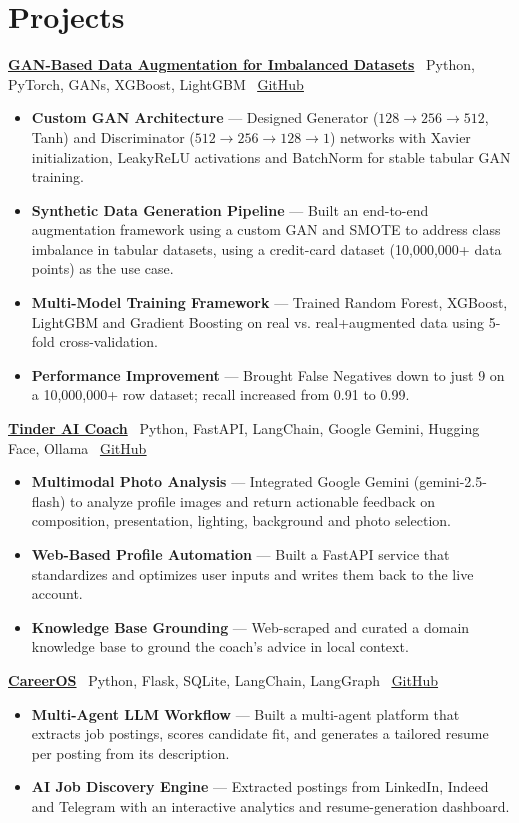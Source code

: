 \documentclass[a4paper,10pt]{article}
\newcommand{\resumeItem}[1]{\item\small{#1}}
\newcommand{\resumeProject}[3]{\vspace{6pt}\underline{\textbf{\normalsize #1}} \textbar\ \small #2 \textbar\ \href{#3}{\underline{GitHub}}\vspace{1pt}}
\newcommand{\resumeItemListStart}{\begin{itemize}[leftmargin=0.18in,itemsep=1pt,topsep=1pt]}
\newcommand{\resumeItemListEnd}{\end{itemize}\vspace{1pt}}
\begin{document}
\section{Projects}

\vspace{-4pt}

\resumeProject
{GAN-Based Data Augmentation for Imbalanced Datasets}
{Python, PyTorch, GANs, XGBoost, LightGBM}
{https://github.com/gorredinesh21/FINAL_YEAR_PROJECT/tree/main}
\resumeItemListStart
\resumeItem{
\textbf{Custom GAN Architecture} --- Designed Generator ($128 \rightarrow 256 \rightarrow 512$, Tanh) and Discriminator ($512 \rightarrow 256 \rightarrow 128 \rightarrow 1$) networks with Xavier initialization, LeakyReLU activations and BatchNorm for stable tabular GAN training.
}
\resumeItem{
\textbf{Synthetic Data Generation Pipeline} --- Built an end-to-end augmentation framework using a custom GAN and SMOTE to address class imbalance in tabular datasets, using a credit-card dataset (10,000,000+ data points) as the use case.
}
\resumeItem{
\textbf{Multi-Model Training Framework} --- Trained Random Forest, XGBoost, LightGBM and Gradient Boosting on real vs. real+augmented data using 5-fold cross-validation.
}
\resumeItem{
\textbf{Performance Improvement} --- Brought False Negatives down to just 9 on a 10,000,000+ row dataset; recall increased from 0.91 to 0.99.
}
\resumeItemListEnd

\resumeProject
{Tinder AI Coach}
{Python, FastAPI, LangChain, Google Gemini, Hugging Face, Ollama}
{https://github.com/gorredinesh21/TINDER_MCP_AI}
\resumeItemListStart
\resumeItem{
\textbf{Multimodal Photo Analysis} --- Integrated Google Gemini (gemini-2.5-flash) to analyze profile images and return actionable feedback on composition, presentation, lighting, background and photo selection.
}
\resumeItem{
\textbf{Web-Based Profile Automation} --- Built a FastAPI service that standardizes and optimizes user inputs and writes them back to the live account.
}
\resumeItem{
\textbf{Knowledge Base Grounding} --- Web-scraped and curated a domain knowledge base to ground the coach's advice in local context.
}
\resumeItemListEnd

\resumeProject
{CareerOS}
{Python, Flask, SQLite, LangChain, LangGraph}
{https://github.com/gorredinesh21/JOB_APPLICATION_HANDLER-}
\resumeItemListStart
\resumeItem{
\textbf{Multi-Agent LLM Workflow} --- Built a multi-agent platform that extracts job postings, scores candidate fit, and generates a tailored resume per posting from its description.
}
\resumeItem{
\textbf{AI Job Discovery Engine} --- Extracted postings from LinkedIn, Indeed and Telegram with an interactive analytics and resume-generation dashboard.
}
\resumeItemListEnd
\end{document}

